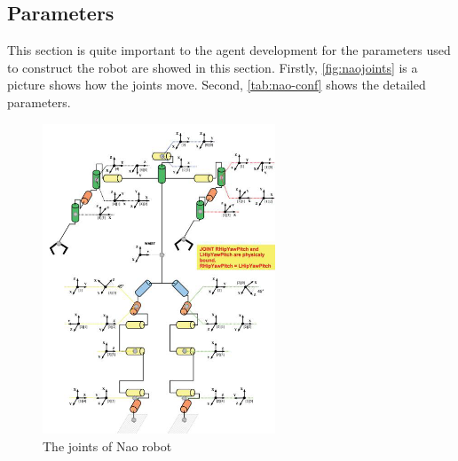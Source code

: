 \subsection{Parameters}
This section is quite important to the agent development for the
parameters used to construct the robot are showed in this section.
Firstly, \autoref{fig:naojoints} is a picture shows how the joints
move. Second, \autoref{tab:nao-conf} shows the detailed parameters.
\begin{figure}[htp]
  \centering
  \includegraphics[width=0.618\textwidth]{fig/naojoints}
  \caption{The joints of Nao robot}
  \label{fig:naojoints}
\end{figure}

